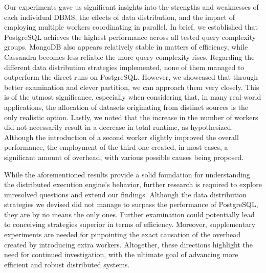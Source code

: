 \documentclass[conference]{IEEEtran}
\begin{document}
Our experiments gave us significant insights into the strengths and weaknesses of each individual DBMS, the effects of data distribution, and the impact of employing multiple workers coordinating in parallel. In brief, we established that PostgreSQL achieves the highest performance across all tested query complexity groups. MongoDB also appears relatively stable in matters of efficiency, while Cassandra becomes less reliable the more query complexity rises. Regarding the different data distribution strategies implemented, none of them managed to outperform the direct runs on PostgreSQL. However, we showcased that through better examination and clever partition, we can approach them very closely. This is of the utmost significance, especially when considering that, in many real-world applications, the allocation of datasets originating from distinct sources is the only realistic option. Lastly, we noted that the increase in the number of workers did not necessarily result in a decrease in total runtime, as hypothesized. Although the introduction of a second worker slightly improved the overall performance, the employment of the third one created, in most cases, a significant amount of overhead, with various possible causes being proposed.

While the aforementioned results provide a solid foundation for understanding the distributed execution engine’s behavior, further research is required to explore unresolved questions and extend our findings. Although the data distribution strategies we devised did not manage to surpass the performance of PostgreSQL, they are by no means the only ones. Further examination could potentially lead to conceiving strategies superior in terms of efficiency. Moreover, supplementary experiments are needed for pinpointing the exact causation of the overhead created by introducing extra workers. Altogether, these directions highlight the need for continued investigation, with the ultimate goal of advancing more efficient and robust distributed systems.

% 
\end{document}
